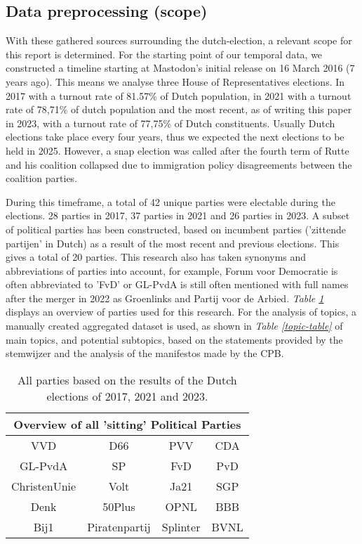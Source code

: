 \subsection{Data preprocessing (scope)}
With these gathered sources surrounding the dutch-election, a relevant scope for this report is determined.
For the starting point of our temporal data, we constructed a timeline starting at Mastodon's initial release on 16 March 2016 (7 years ago).
This means we analyse three House of Representatives elections.
In 2017 with a turnout rate of 81.57\% of Dutch population, in 2021 with a turnout rate of 78,71\% of dutch population and the most recent, as of writing this paper in 2023, with a turnout rate of 77,75\% of Dutch constituents.
Usually Dutch elections take place every four years, thus we expected the next elections to be held in 2025.
However, a snap election was called after the fourth term of Rutte and his coalition collapsed due to immigration policy disagreements between the coalition parties.

During this timeframe, a total of 42 unique parties were electable during the elections.
28 parties in 2017, 37 parties in 2021 and 26 parties in 2023.
A subset of political parties has been constructed, based on incumbent parties ('zittende partijen' in Dutch) as a result of the most recent and previous elections.
This gives a total of 20 parties.
This research also has taken synonyms and abbreviations of parties into account, for example, Forum voor Democratie is often abbreviated to 'FvD' or GL-PvdA is still often mentioned with full names after the merger in 2022 as Groenlinks and Partij voor de Arbied.
\textit{Table \ref{party-table}} displays an overview of parties used for this research.
For the analysis of topics, a manually created aggregated dataset is used, as shown in \textit{Table \ref{topic-table}} of main topics, and potential subtopics, based on the statements provided by the stemwijzer and the analysis of the manifestos made by the CPB.  \\

\begin{table}
\centering
\begin{tabular}{||c c c c||} 
 \hline
 \multicolumn{4}{|c|}{\textbf{Overview of all 'sitting' Political Parties}} \\
 \hline
 VVD & D66 & PVV & CDA \\
 \hline
 GL-PvdA & SP & FvD & PvD \\
 \hline
 ChristenUnie & Volt & Ja21 & SGP \\
 \hline
 Denk & 50Plus & OPNL & BBB \\
 \hline
 Bij1 & Piratenpartij &  Splinter & BVNL  \\ [1ex] 
 \hline
\end{tabular}
\caption{All parties based on the results of the Dutch elections of 2017, 2021 and 2023.}
\label{party-table}
\end{table}

